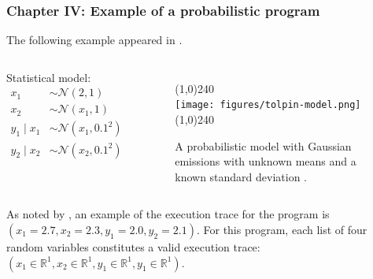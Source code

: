 \documentclass[aspectratio=169]{beamer}
\begin{document}
\begin{frame}
    \frametitle{Chapter IV: Example of a probabilistic program}
    The following example appeared in \citep{tolpin2015probabilistic}. 
    \vspace{-0.7cm}
    \begin{columns}[c] 
        Statistical model:
        \begin{align*}
            x_1 &\sim \mathcal{N}(2,1) \\ 
            x_2 &\sim \mathcal{N}(x_1,1) \\
            y_1 \mid x_1 &\sim \mathcal{N}(x_1,0.1^2) \\
            y_2 \mid x_2 &\sim \mathcal{N}(x_2,0.1^2) 
        \end{align*}
        \begin{figure}[ht!]
            \line(1,0){240}\\
            \texttt{[image: figures/tolpin-model.png]}\\
            \vspace{-0.4cm}
            \line(1,0){240}\\
            \caption{A probabilistic model with Gaussian emissions with unknown means and a known standard deviation
                \citep{perov2016applications}.}
        \end{figure}
    \end{columns}
    As noted by \citet{perov2016applications}, an example of the execution trace for the program is $(x_1 = 2.7, x_2 =
    2.3, y_1 = 2.0, y_2 = 2.1)$. For this program, each list of four random variables constitutes a valid execution
    trace: $(x_1 \in  \mathbb{R}^1, x_2 \in \mathbb{R}^1, y_1 \in \mathbb{R}^1, y_1 \in \mathbb{R}^1)$.
\end{frame}

\end{document}
